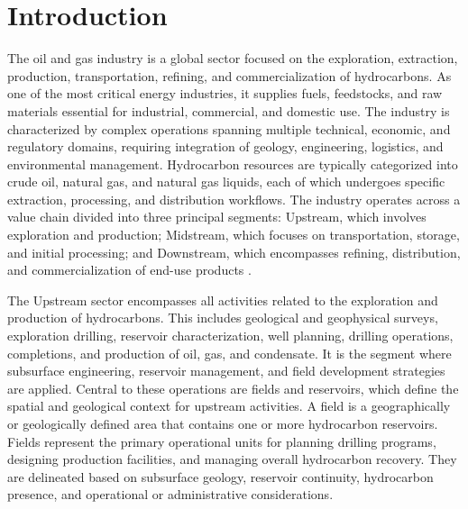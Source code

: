 \documentclass[12pt,APA]{uomthesis}
\begin{document}
\iftables
    \begin{LoT}
    \makeatletter
    \makeatother
    \end{LoT}
\fi

\ifabbrs
    \printacronyms
\fi

\ifappens
    \begin{LoAp}
    \makeatletter
    \makeatother
    \end{LoAp}
\fi

\startContent


\chapter{Introduction}
\label{ch:intro}

The oil and gas industry is a global sector focused on the exploration, extraction, production, transportation, refining, and commercialization of hydrocarbons. As one of the most critical energy industries, it supplies fuels, feedstocks, and raw materials essential for industrial, commercial, and domestic use. The industry is characterized by complex operations spanning multiple technical, economic, and regulatory domains, requiring integration of geology, engineering, logistics, and environmental management. Hydrocarbon resources are typically categorized into crude oil, natural gas, and natural gas liquids, each of which undergoes specific extraction, processing, and distribution workflows. The industry operates across a value chain divided into three principal segments: Upstream, which involves exploration and production; Midstream, which focuses on transportation, storage, and initial processing; and Downstream, which encompasses refining, distribution, and commercialization of end-use products \citep{spe_petroleum_engineering_handbook, ahmed2010reservoir}. 

The Upstream sector encompasses all activities related to the exploration and production of hydrocarbons. This includes geological and geophysical surveys, exploration drilling, reservoir characterization, well planning, drilling operations, completions, and production of oil, gas, and condensate. It is the segment where subsurface engineering, reservoir management, and field development strategies are applied. Central to these operations are fields and reservoirs, which define the spatial and geological context for upstream activities. A field is a geographically or geologically defined area that contains one or more hydrocarbon reservoirs. Fields represent the primary operational units for planning drilling programs, designing production facilities, and managing overall hydrocarbon recovery. They are delineated based on subsurface geology, reservoir continuity, hydrocarbon presence, and operational or administrative considerations. 
\end{document}
